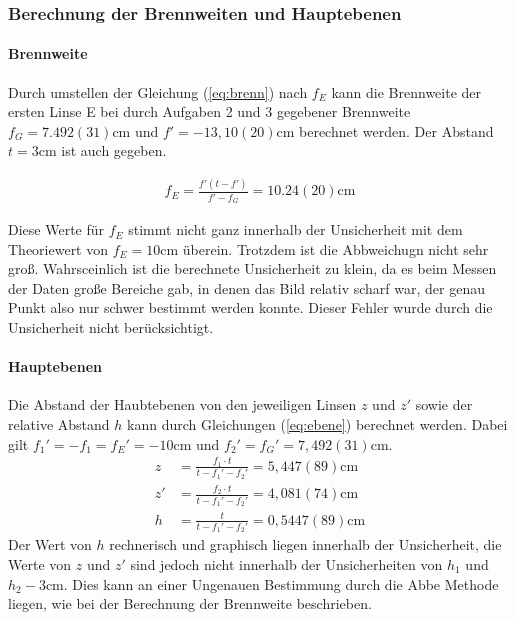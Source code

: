 \documentclass[11pt, a4paper]{article}
\begin{document}
    \subsubsection{Berechnung der Brennweiten und Hauptebenen}
    \paragraph{Brennweite}
    Durch umstellen der Gleichung (\ref{eq:brenn}) nach $f_E$ kann die Brennweite der ersten Linse E bei durch Aufgaben 2 und 3 gegebener Brennweite $f_G = 7.492(31) \si{\centi\metre}$ und $f' = - 13,10(20) \si{\centi\metre}$ berechnet werden. Der Abstand $t = 3 \si{\centi\metre}$ ist auch gegeben.

    \begin{align}
        f_E = \frac{f' \left(t - f'\right)}{f' - f_G} = 10.24(20) \si{\centi\metre}
    \end{align}

    Diese Werte für $f_E$ stimmt nicht ganz innerhalb der Unsicherheit mit dem Theoriewert von $f_E = 10 \si{\centi\metre}$ überein. Trotzdem ist die Abbweichugn nicht sehr groß. Wahrsceinlich ist die berechnete Unsicherheit zu klein, da es beim Messen der Daten große Bereiche gab, in denen das Bild relativ scharf war, der genau Punkt also nur schwer bestimmt werden konnte. Dieser Fehler wurde durch die Unsicherheit nicht berücksichtigt.

    \paragraph{Hauptebenen}
    Die Abstand der Haubtebenen von den jeweiligen Linsen $z$ und $z'$ sowie der relative Abstand $h$ kann durch Gleichungen (\ref{eq:ebene}) berechnet werden. Dabei gilt $f_1' = -f_1 = f_E' = -10 \si{\centi\metre}$ und $f_2' = f_G' = 7,492(31) \si{\centi\metre}$.
    \begin{align}
        z &= \frac{f_1 \cdot t}{t - f_1' - f_2'} = 5,447(89) \si{\centi\metre} \\
        z' &= \frac{f_2 \cdot t}{t - f_1' - f_2'} = 4,081(74) \si{\centi\metre} \\
        h &= \frac{t}{t - f_1' - f_2'} = 0,5447(89) \si{\centi\metre}
    \end{align}
    Der Wert von $h$ rechnerisch und graphisch liegen innerhalb der Unsicherheit, die Werte von $z$ und $z'$ sind jedoch nicht innerhalb der Unsicherheiten von $h_1$ und $h_2 - 3 \si{\centi\metre}$. Dies kann an einer Ungenauen Bestimmung durch die Abbe Methode liegen, wie bei der Berechnung der Brennweite beschrieben.
\end{document}
